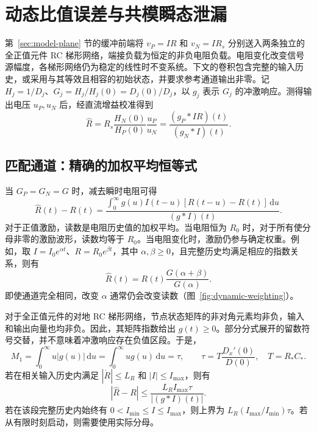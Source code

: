 \section{动态比值误差与共模瞬态泄漏}
\label{sec:dynamic}

第~\ref{sec:model-plane} 节的缓冲前端将 $v_P=IR$ 和 $v_N=IR_s$ 分别送入两条独立的全正值元件 RC 梯形网络，端接负载为恒定的非负电阻负载。电阻变化改变信号源幅度，各梯形网络仍为稳定的线性时不变系统。下文的卷积包含完整的输入历史，或采用与其等效且相容的初始状态，并要求参考通道输出非零。记 $H_j=1/D_j$、$G_j=H_j/H_j(0)=D_j(0)/D_j$，以 $g_j$ 表示 $G_j$ 的冲激响应。测得输出电压 $u_P,u_N$ 后，经直流增益校准得到
\begin{equation}\label{eq:ratio-readout}
\hat R=R_s\frac{H_N(0)}{H_P(0)}\frac{u_P}{u_N}
=\frac{(g_P\ast IR)(t)}{(g_N\ast I)(t)}.
\end{equation}

\subsection{匹配通道：精确的加权平均恒等式}
\label{sec:dynamic-matched}

当 $G_P=G_N=G$ 时，减去瞬时电阻可得
\begin{equation}\label{eq:weighted-average}
\hat R(t)-R(t)=\frac{\displaystyle\int_0^\infty g(u)I(t-u)[R(t-u)-R(t)]\,\mathrm du}
{(g\ast I)(t)}.
\end{equation}
对于正值激励，读数是电阻历史值的加权平均。当电阻恒为 $R_0$ 时，对于所有使分母非零的激励波形，读数均等于 $R_0$。当电阻变化时，激励仍参与确定权重。例如，取 $I=I_0e^{\alpha t}$、$R=R_0e^{\beta t}$，其中 $\alpha,\beta\ge0$，且完整历史均满足相应的指数关系，则有
\begin{equation}\label{eq:dynamic-exp}
\hat R(t)=R(t)\frac{G(\alpha+\beta)}{G(\alpha)}.
\end{equation}
即使通道完全相同，改变 $\alpha$ 通常仍会改变读数（图~\ref{fig:dynamic-weighting}）。

对于全正值元件的对地 RC 梯形网络，节点状态矩阵的非对角元素均非负，输入和输出向量也均非负。因此，其矩阵指数给出 $g(t)\ge0$。部分分式展开的留数符号交替，并不意味着冲激响应存在负值区段。于是，
\begin{equation}\label{eq:dynamic-moment}
M_1=\int_0^\infty u|g(u)|\,\mathrm du
=\int_0^\infty ug(u)\,\mathrm du=\tau,
\qquad \tau=T\frac{D_x'(0)}{D(0)},\quad T=R_*C_*.
\end{equation}
若在相关输入历史内满足 $|\dot R|\le L_R$ 和 $|I|\le I_{\max}$，则有
\begin{equation}\label{eq:lag-bound}
|\hat R-R|\le\frac{L_R I_{\max}\tau}{|(g\ast I)(t)|}.
\end{equation}
若在该段完整历史内始终有 $0<I_{\min}\le I\le I_{\max}$，则上界为 $L_R(I_{\max}/I_{\min})\tau$。若从有限时刻启动，则需要使用实际分母。

